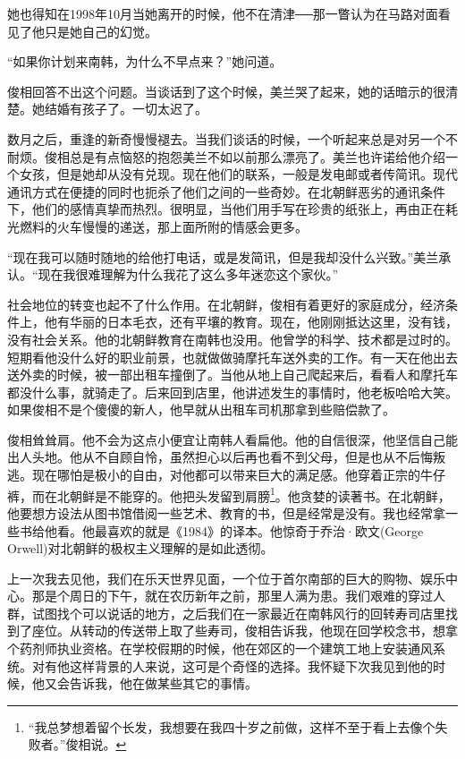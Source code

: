 她也得知在1998年10月当她离开的时候，他不在清津──那一瞥认为在马路对面看见了他只是她自己的幻觉。

“如果你计划来南韩，为什么不早点来？”她问道。

俊相回答不出这个问题。当谈话到了这个时候，美兰哭了起来，她的话暗示的很清楚。她结婚有孩子了。一切太迟了。

数月之后，重逢的新奇慢慢褪去。当我们谈话的时候，一个听起来总是对另一个不耐烦。俊相总是有点恼怒的抱怨美兰不如以前那么漂亮了。美兰也许诺给他介绍一个女孩，但是她却从没有兑现。现在他们的联系，一般是发电邮或者传简讯。现代通讯方式在便捷的同时也扼杀了他们之间的一些奇妙。在北朝鲜恶劣的通讯条件下，他们的感情真挚而热烈。很明显，当他们用手写在珍贵的纸张上，再由正在耗光燃料的火车慢慢的递送，那上面所附的情感会更多。

“现在我可以随时随地的给他打电话，或是发简讯，但是我却没什么兴致。”美兰承认。“现在我很难理解为什么我花了这么多年迷恋这个家伙。”

社会地位的转变也起不了什么作用。在北朝鲜，俊相有着更好的家庭成分，经济条件上，他有华丽的日本毛衣，还有平壤的教育。现在，他刚刚抵达这里，没有钱，没有社会关系。他的北朝鲜教育在南韩也没用。他曾学的科学、技术都是过时的。短期看他没什么好的职业前景，也就做做骑摩托车送外卖的工作。有一天在他出去送外卖的时候，被一部出租车撞倒了。当他从地上自己爬起来后，看看人和摩托车都没什么事，就骑走了。后来回到店里，他讲述发生的事情时，他老板哈哈大笑。如果俊相不是个傻傻的新人，他早就从出租车司机那拿到些赔偿款了。

俊相耸耸肩。他不会为这点小便宜让南韩人看扁他。他的自信很深，他坚信自己能出人头地。他从不自顾自怜，虽然担心以后再也看不到父母，但是也从不后悔叛逃。现在哪怕是极小的自由，对他都可以带来巨大的满足感。他穿着正宗的牛仔裤，而在北朝鲜是不能穿的。他把头发留到肩膀\footnote{“我总梦想着留个长发，我想要在我四十岁之前做，这样不至于看上去像个失败者。”俊相说。}。他贪婪的读著书。在北朝鲜，他要想方设法从图书馆借阅一些艺术、教育的书，但是经常是没有。我也经常拿一些书给他看。他最喜欢的就是《1984》的译本。他惊奇于乔治·欧文(George Orwell)对北朝鲜的极权主义理解的是如此透彻。

上一次我去见他，我们在乐天世界见面，一个位于首尔南部的巨大的购物、娱乐中心。那是个周日的下午，就在农历新年之前，那里人满为患。我们艰难的穿过人群，试图找个可以说话的地方，之后我们在一家最近在南韩风行的回转寿司店里找到了座位。从转动的传送带上取了些寿司，俊相告诉我，他现在回学校念书，想拿个药剂师执业资格。在学校假期的时候，他在郊区的一个建筑工地上安装通风系统。对有他这样背景的人来说，这可是个奇怪的选择。我怀疑下次我见到他的时候，他又会告诉我，他在做某些其它的事情。

